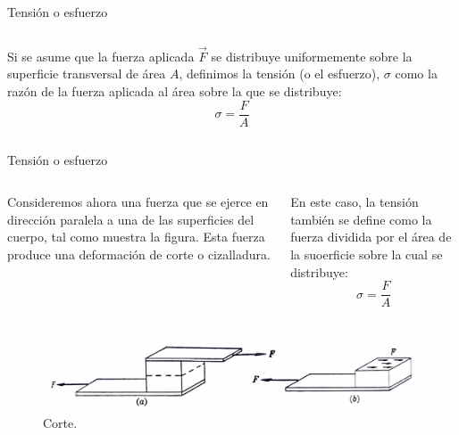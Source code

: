 \documentclass[11pt,handout,aspectratio=1610]{beamer}
\newcommand{\vs}{\vspace{11pt}}
\begin{document}
\begin{frame}{Tensión o esfuerzo}
\begin{columns}
\begin{column}{0.6\textwidth}
            \vs

            Si se asume que la fuerza aplicada $\vec{F}$ se distribuye uniformemente sobre la superficie transversal de área $A$, definimos la tensión (o el esfuerzo), $\sigma$ como la razón de la fuerza aplicada al área sobre la que se distribuye: $$ \sigma = \frac{F}{A} $$
        \end{column}
    \end{columns}

\end{frame}

\begin{frame}{Tensión o esfuerzo}

    \begin{columns}
        \begin{column}{0.4\textwidth}
            Consideremos ahora una fuerza que se ejerce en dirección paralela a una de las superficies del cuerpo, tal como muestra la figura. Esta fuerza produce una deformación de corte o cizalladura.
        \end{column}
        \begin{column}{0.4\textwidth}
            En este caso, la tensión también se define como la fuerza dividida por el área de la suoerficie sobre la cual se distribuye: $$ \sigma = \frac{F}{A} $$
        \end{column}
    \end{columns}

    \begin{figure}
        \centering
        \includegraphics[width=\textwidth]{../figs/cortante.pdf}
        \caption{Corte.}
    \end{figure}

\end{frame}
\end{document}
